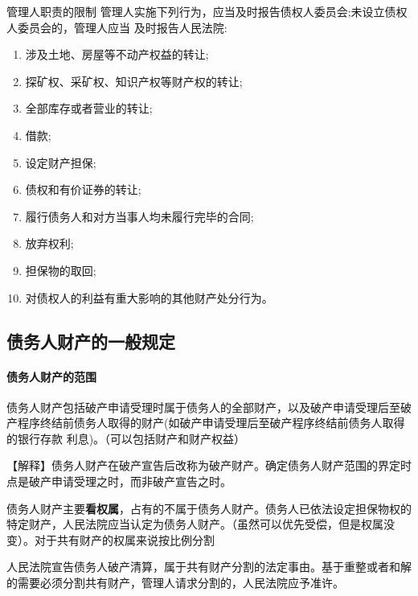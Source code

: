 \documentclass[UTF8,12pt]{ctexart}
\numberwithin{equation}{section} %
\numberwithin{figure}{section}
\numberwithin{table}{section}
\begin{document}
	管理人职责的限制 管理人实施下列行为，应当及时报告债权人委员会;未设立债权人委员会的，管理人应当 及时报告人民法院:
	\begin{enumerate}
		\item 涉及土地、房屋等不动产权益的转让;
		
		\item 探矿权、采矿权、知识产权等财产权的转让;
		
		\item 全部库存或者营业的转让;
		
		\item 借款;
		
		\item 设定财产担保;
		
		\item 债权和有价证券的转让;
		
		\item 履行债务人和对方当事人均未履行完毕的合同;
		
		\item 放弃权利;
		
		\item 担保物的取回;
		
		\item 对债权人的利益有重大影响的其他财产处分行为。
	\end{enumerate}
	
	\subsection{债务人财产的一般规定}
	\paragraph{债务人财产的范围}
	
	
	债务人财产包括破产申请受理时属于债务人的全部财产，以及破产申请受理后至破产程序终结前债务人取得的财产(如破产申请受理后至破产程序终结前债务人取得的银行存款 利息)。（可以包括财产和财产权益）
	
	【解释】债务人财产在破产宣告后改称为破产财产。确定债务人财产范围的界定时点是破产申请受理之时，而非破产宣告之时。
	
	债务人财产主要\textbf{看权属}，占有的不属于债务人财产。债务人已依法设定担保物权的特定财产，人民法院应当认定为债务人财产。（虽然可以优先受偿，但是权属没变）。对于共有财产的权属来说按比例分割
	
	人民法院宣告债务人破产清算，属于共有财产分割的法定事由。基于重整或者和解的需要必须分割共有财产，管理人请求分割的，人民法院应予准许。
	
\end{document}
